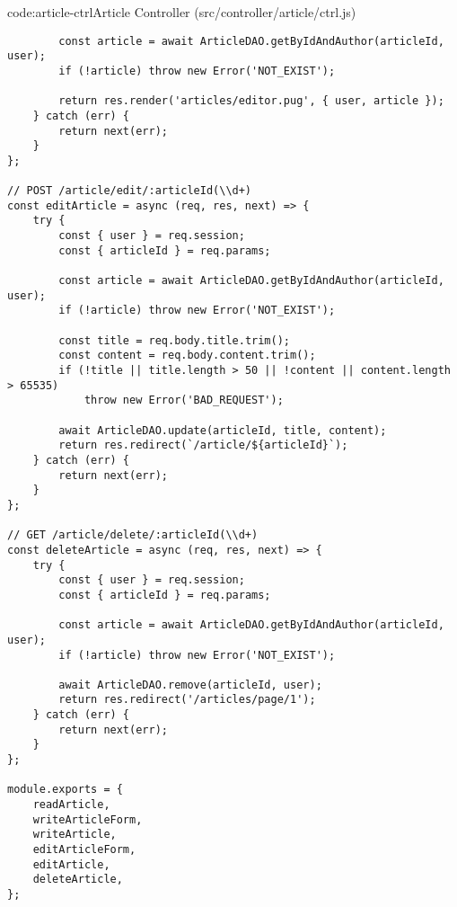 \begin{code}{code:article-ctrl}{Article Controller (src/controller/article/ctrl.js)}
\begin{verbatim}
        const article = await ArticleDAO.getByIdAndAuthor(articleId, user);
        if (!article) throw new Error('NOT_EXIST');

        return res.render('articles/editor.pug', { user, article });
    } catch (err) {
        return next(err);
    }
};

// POST /article/edit/:articleId(\\d+)
const editArticle = async (req, res, next) => {
    try {
        const { user } = req.session;
        const { articleId } = req.params;

        const article = await ArticleDAO.getByIdAndAuthor(articleId, user);
        if (!article) throw new Error('NOT_EXIST');

        const title = req.body.title.trim();
        const content = req.body.content.trim();
        if (!title || title.length > 50 || !content || content.length > 65535)
            throw new Error('BAD_REQUEST');

        await ArticleDAO.update(articleId, title, content);
        return res.redirect(`/article/${articleId}`);
    } catch (err) {
        return next(err);
    }
};

// GET /article/delete/:articleId(\\d+)
const deleteArticle = async (req, res, next) => {
    try {
        const { user } = req.session;
        const { articleId } = req.params;

        const article = await ArticleDAO.getByIdAndAuthor(articleId, user);
        if (!article) throw new Error('NOT_EXIST');

        await ArticleDAO.remove(articleId, user);
        return res.redirect('/articles/page/1');
    } catch (err) {
        return next(err);
    }
};

module.exports = {
    readArticle,
    writeArticleForm,
    writeArticle,
    editArticleForm,
    editArticle,
    deleteArticle,
};
\end{verbatim}
\end{code}

